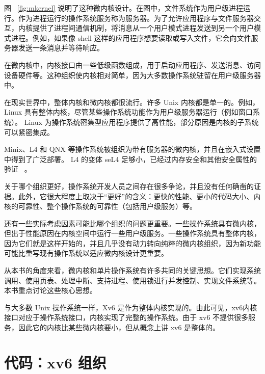 \documentclass[UTF8]{article}
\begin{document}
图~    \ref{fig:mkernel}    说明了这种微内核设计。在图中，文件系统作为用户级进程运行。作为进程运行的操作系统服务称为服务器。为了允许应用程序与文件服务器交互，内核提供了进程间通信机制，将消息从一个用户模式进程发送到另一个用户模式进程。例如，如果像 shell 这样的应用程序想要读取或写入文件，它会向文件服务器发送一条消息并等待响应。  

在微内核中，内核接口由一些低级函数组成，用于启动应用程序、发送消息、访问设备硬件等。这种组织使内核相对简单，因为大多数操作系统驻留在用户级服务器中。  

在现实世界中，整体内核和微内核都很流行。许多 Unix 内核都是单一的。例如，Linux 具有整体内核，尽管某些操作系统功能作为用户级服务器运行（例如窗口系统）。 Linux 为操作系统密集型应用程序提供了高性能，部分原因是内核的子系统可以紧密集成。  

Minix、L4 和 QNX 等操作系统被组织为带有服务器的微内核，并且在嵌入式设置中得到了广泛部署。 L4 的变体 seL4 足够小，已经过内存安全和其他安全属性的验证~    \cite{sel4}    。  

关于哪个组织更好，操作系统开发人员之间存在很多争论，并且没有任何确凿的证据。此外，它很大程度上取决于“更好”的含义：更快的性能、更小的代码大小、内核的可靠性、整个操作系统的可靠性（包括用户级服务）等。  

还有一些实际考虑因素可能比哪个组织的问题更重要。一些操作系统具有微内核，但出于性能原因在内核空间中运行一些用户级服务。一些操作系统具有整体内核，因为它们就是这样开始的，并且几乎没有动力转向纯粹的微内核组织，因为新功能可能比重写现有操作系统以适应微内核设计更重要。  

从本书的角度来看，微内核和单片操作系统有许多共同的关键思想。它们实现系统调用、使用页表、处理中断、支持进程、使用锁进行并发控制、实现文件系统等。本书重点讨论这些核心思想。  

与大多数 Unix 操作系统一样，Xv6 是作为整体内核实现的。由此可见，xv6内核接口对应于操作系统接口，内核实现了完整的操作系统。由于 xv6 不提供很多服务，因此它的内核比某些微内核要小，但从概念上讲 xv6 是整体的。  

   \section{代码：xv6 组织  }     
\end{document}
